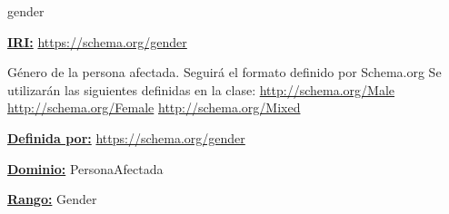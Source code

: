 





\begin{mybox}{gender}
\begin{flushleft}
\underline{\textbf{IRI:}}
\url{https://schema.org/gender}
\newline

Género de la persona afectada.
\newline Seguirá el formato definido por Schema.org \cite{schema_gender}
Se utilizarán las siguientes definidas en la clase:
\newline \url{http://schema.org/Male}
\newline \url{http://schema.org/Female}
\newline \url{http://schema.org/Mixed}
\newline

\underline{\textbf{Definida por:}}\newline
\url{https://schema.org/gender}
\newline

\underline{\textbf{Dominio:}} PersonaAfectada
\newline

\underline{\textbf{Rango:}} Gender \cite{schema_gender_explicacion_rango}

\end{flushleft}
\end{mybox}







